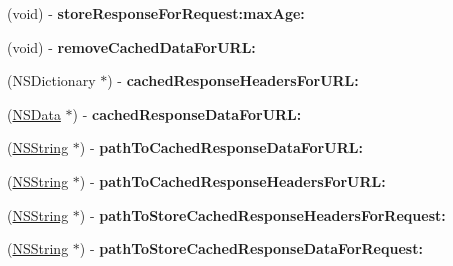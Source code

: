 \begin{DoxyCompactItemize}
\item 
\hypertarget{protocol_a_s_i_cache_delegate-p_ae7cfacf47d3d24e151530c033f993734}{
(void) -\/ {\bfseries store\-Response\-For\-Request\-:max\-Age\-:}}
\label{protocol_a_s_i_cache_delegate-p_ae7cfacf47d3d24e151530c033f993734}

\item 
\hypertarget{protocol_a_s_i_cache_delegate-p_aa2d162430d8c9bc47057030b3e305f18}{
(void) -\/ {\bfseries remove\-Cached\-Data\-For\-U\-R\-L\-:}}
\label{protocol_a_s_i_cache_delegate-p_aa2d162430d8c9bc47057030b3e305f18}

\item 
\hypertarget{protocol_a_s_i_cache_delegate-p_ab7b267fc153dcf624c91e2d07513f868}{
(\-N\-S\-Dictionary $\ast$) -\/ {\bfseries cached\-Response\-Headers\-For\-U\-R\-L\-:}}
\label{protocol_a_s_i_cache_delegate-p_ab7b267fc153dcf624c91e2d07513f868}

\item 
\hypertarget{protocol_a_s_i_cache_delegate-p_a24c0d2a6834e5a0332f3d95198fc681c}{
(\hyperlink{class_n_s_data}{\-N\-S\-Data} $\ast$) -\/ {\bfseries cached\-Response\-Data\-For\-U\-R\-L\-:}}
\label{protocol_a_s_i_cache_delegate-p_a24c0d2a6834e5a0332f3d95198fc681c}

\item 
\hypertarget{protocol_a_s_i_cache_delegate-p_a692463be3a5c9abe5a239eb761431799}{
(\hyperlink{class_n_s_string}{\-N\-S\-String} $\ast$) -\/ {\bfseries path\-To\-Cached\-Response\-Data\-For\-U\-R\-L\-:}}
\label{protocol_a_s_i_cache_delegate-p_a692463be3a5c9abe5a239eb761431799}

\item 
\hypertarget{protocol_a_s_i_cache_delegate-p_a0cab288cf23b1d6adb76981ed591d324}{
(\hyperlink{class_n_s_string}{\-N\-S\-String} $\ast$) -\/ {\bfseries path\-To\-Cached\-Response\-Headers\-For\-U\-R\-L\-:}}
\label{protocol_a_s_i_cache_delegate-p_a0cab288cf23b1d6adb76981ed591d324}

\item 
\hypertarget{protocol_a_s_i_cache_delegate-p_ab9a190279d92a9fc5d7efeff1efad0ad}{
(\hyperlink{class_n_s_string}{\-N\-S\-String} $\ast$) -\/ {\bfseries path\-To\-Store\-Cached\-Response\-Headers\-For\-Request\-:}}
\label{protocol_a_s_i_cache_delegate-p_ab9a190279d92a9fc5d7efeff1efad0ad}

\item 
\hypertarget{protocol_a_s_i_cache_delegate-p_ab7f2a212c2d6391b1d9fb7a8da9f2c39}{
(\hyperlink{class_n_s_string}{\-N\-S\-String} $\ast$) -\/ {\bfseries path\-To\-Store\-Cached\-Response\-Data\-For\-Request\-:}}
\label{protocol_a_s_i_cache_delegate-p_ab7f2a212c2d6391b1d9fb7a8da9f2c39}


\end{DoxyCompactItemize}
